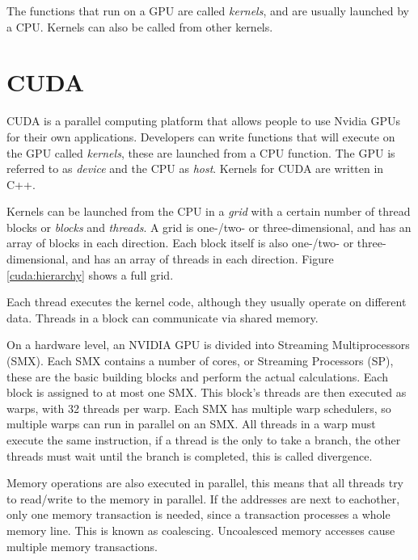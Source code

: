 \documentclass[../main/thesis.tex]{subfiles}
\begin{document}
The functions that run on a GPU are called \textit{kernels}, and are usually launched by a CPU.
Kernels can also be called from other kernels.


\section{CUDA}
CUDA is a parallel computing platform that allows people to use Nvidia GPUs for their own applications.
Developers can write functions that will execute on the GPU called \textit{kernels}, these are launched from a CPU function.
The GPU is referred to as \textit{device} and the CPU as \textit{host}.
Kernels for CUDA are written in C++.

Kernels can be launched from the CPU in a \textit{grid} with a certain number of thread blocks or \textit{blocks} and \textit{threads}.
A grid is one-/two- or three-dimensional, and has an array of blocks in each direction.
Each block itself is also one-/two- or three-dimensional, and has an array of threads in each direction.
Figure \ref{cuda:hierarchy} shows a full grid.


Each thread executes the kernel code, although they usually operate on different data.
Threads in a block can communicate via shared memory.

On a hardware level, an NVIDIA GPU is divided into Streaming Multiprocessors (SMX).
Each SMX contains a number of cores, or Streaming Processors (SP), these are the basic building blocks and perform the actual calculations.
Each block is assigned to at most one SMX.
This block's threads are then executed as warps, with 32 threads per warp.
Each SMX has multiple warp schedulers, so multiple warps can run in parallel on an SMX.
All threads in a warp must execute the same instruction, if a thread is the only to take a branch, the other threads must wait until the branch is completed, this is called divergence.

Memory operations are also executed in parallel, this means that all threads try to read/write to the memory in parallel.
If the addresses are next to eachother, only one memory transaction is needed, since a transaction processes a whole memory line.
This is known as coalescing.
Uncoalesced memory accesses cause multiple memory transactions.
\end{document}
